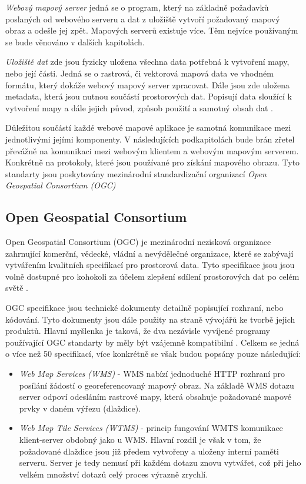 \textit{Webový mapový server} jedná se o program, který na základně
požadavků poslaných od webového serveru a dat z uložiště vytvoří
požadovaný mapový obraz a odešle jej zpět. Mapových serverů existuje
více. Těm nejvíce používaným se bude věnováno v dalších kapitolách.

\textit{Uložiště dat} zde jsou fyzicky uložena všechna data potřebná k
vytvoření mapy, nebo její části. Jedná se o rastrová, či vektorová
mapová data ve vhodném formátu, který dokáže webový mapový server
zpracovat. Dále jsou zde uložena metadata, která jsou nutnou součástí
prostorových dat. Popisují data sloužící k vytvoření mapy a dále
jejich původ, způsob použití a samotný obsah dat \cite{web_mapping}.

Důležitou součástí každé webové mapové aplikace je samotná komunikace
mezi jednotlivými jejími komponenty. V následujících podkapitolách
bude brán zřetel převážně na komunikaci mezi webovým klientem a
webovým mapovým serverem. Konkrétně na protokoly, které jsou používané
pro získání mapového obrazu. Tyto standarty jsou poskytovány
mezinárodní standardizační organizací \textit{Open Geospatial
  Consortium (OGC)}

\subsection{Open Geospatial Consortium}

Open Geospatial Consortium (OGC) je mezinárodní nezisková organizace
zahrnující komerční, vědecké, vládní a nevýdělečné organizace, které
se zabývají vytvářením kvalitních specifikací pro prostorová
data. Tyto specifikace jsou jsou volně dostupné pro kohokoli za účelem
zlepšení sdílení prostorových dat po celém světě \cite{oqc_web}.

OGC specifikace jsou technické dokumenty detailně popisující rozhraní,
nebo kódování. Tyto dokumenty jsou dále použity na straně vývojářů ke
tvorbě jejich produktů. Hlavní myšlenka je taková, že dva nezávisle
vyvíjené programy používající OGC standarty by měly být vzájemně
kompatibilní \cite{oqc_web}. Celkem se jedná o více než 50
specifikací, více konkrétně se však budou popsány pouze následující:

\newpage
\begin{itemize}
\item\textit{Web Map Services (WMS)} - WMS nabízí jednoduché HTTP
  rozhraní pro posílání žádostí o georeferencovaný mapový obraz. Na
  základě WMS dotazu server odpoví odesláním rastrové mapy, která
  obsahuje požadované mapové prvky v daném výřezu (dlaždice).
	 
\item\textit{Web Map Tile Services (WTMS)} - princip fungování WMTS
  komunikace klient-server obdobný jako u WMS. Hlavní rozdíl je však v
  tom, že požadované dlaždice jsou již předem vytvořeny a uloženy
  interní paměti serveru. Server je tedy nemusí při každém dotazu
  znovu vytvářet, což při jeho velkém množství dotazů celý proces
  výrazně zrychlí.
\end{itemize}

